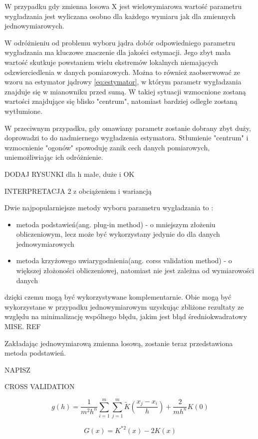 W przypadku gdy zmienna losowa X jest wielowymiarowa wartość parametru wygładzania jest wyliczana osobno dla każdego wymiaru jak dla zmiennych jednowymiarowych. 

W odróżnieniu od problemu wyboru jądra dobór odpowiedniego parametru wygładzania ma kluczowe znaczenie dla jakości estymacji. Jego zbyt mała wartość skutkuje powstaniem wielu ekstremów lokalnych niemających odzwierciedlenia w danych pomiarowych. Można to również zaobserwować ze wzoru na estymator jądrowy \ref{eq:estymator}, w którym parametr wygładzania znajduje się w mianowniku przed sumą. W takiej sytuacji wzmocnione zostaną wartości znajdujące się blisko "centrum", natomiast bardziej odległe zostaną wytłumione.

W przeciwnym przypadku, gdy omawiany parametr zostanie dobrany zbyt duży, doprowadzi to do nadmiernego wygładzenia estymatora. Stłumienie "centrum" i wzmocnienie "ogonów" spowoduję zanik cech danych pomiarowych, uniemożliwiając ich odróżnienie.

DODAJ RYSUNKI dla h małe, duże i OK

INTERPRETACJA 2 z obciążeniem i wariancją

Dwie najpopularniejsze metody wyboru parametru wygładzania to :
\begin{itemize}
\item metoda podstawień(ang. plug-in method) - o mniejszym złożeniu obliczeniowym, lecz może być wykorzystany jedynie do dla danych jednowymiarowych
\item metoda krzyżowego uwiarygodnienia(ang. corss validation method) - o większej złożoności obliczeniowej, natomiast nie jest zależna od wymiarowości danych
\end{itemize}
dzięki czemu mogą być wykorzystywane komplementarnie. Obie mogą być wykorzystane w przypadku jednowymiarowym uzyskując zbliżone rezultaty ze względu na minimalizację wspólnego błędu, jakim jest błąd średniokwadratowy MISE. REF

Zakładając jednowymiarową zmienna losową, zostanie teraz przedstawiona metoda podstawień.

NAPISZ

CROSS VALIDATION

\begin{equation}
g(h)=\frac{1}{m^2h^n}\displaystyle\sum_{i=1}^{m} \displaystyle\sum_{j=1}^{m} \widetilde{K}(\frac{x_j - x_i}{h}) + \frac{2}{mh^n}K(0)
\end{equation}

\begin{equation}
G(x) = K^{*2}(x) - 2K(x)
\end{equation}


